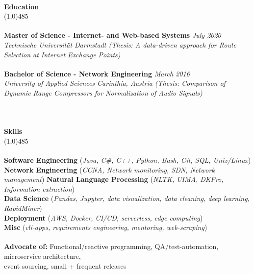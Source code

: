 \documentclass[9pt]{extarticle}
\newcommand\tab[1][1cm]{\hspace*{#1}}
\newcommand\smallspace[1][0.23cm]{\hspace*{#1}}
\newcommand\negativespace[1][-0.12cm]{\hspace*{#1}}
\begin{document}
\noindent %
\\
\vspace*{-6pt}
{\negativespace \Large \bf Education}\\
\line(1,0){485}\\
\\
\noindent
{\bf Master of Science - Internet- and Web-based Systems} \hfill \textit{July 2020} \\ 
\textit{Technische Universität Darmstadt (Thesis: A data-driven approach for Route Selection at Internet Exchange Points)}\\\\
\noindent
{\bf Bachelor of Science - Network Engineering} \hfill \textit{March 2016} \\
\textit{University of Applied Sciences Carinthia, Austria (Thesis: Comparison of Dynamic Range Compressors for Normalization of Audio Signals)}\\
\\
\\\\
\vspace*{-6pt}
{\negativespace \Large \bf Skills}\\
\line(1,0){485}\\
\\
\noindent
{\bf Software Engineering }(\textit{Java, C\#, C++, Python, Bash, Git, SQL, Unix/Linux})
{\bf Network Engineering }(\textit{CCNA, Network monitoring, SDN, Network management})
{\bf Natural Language Processing }(\textit{NLTK, UIMA, DKPro, Information extraction}) \\
{\bf Data Science }(\textit{Pandas, Jupyter, data visualization, data cleaning, deep learning, RapidMiner}) \\
{\bf Deployment }(\textit{AWS, Docker, CI/CD, serverless, edge computing}) \\
{\bf Misc }(\textit{cli-apps, requirements engineering, mentoring, web-scraping}) \\\\
\noindent
{\bf Advocate of:} Functional/reactive programming, QA/test-automation, microservice architecture,\\ 
 \tab \tab \smallspace event sourcing, small + frequent releases
\end{document}
